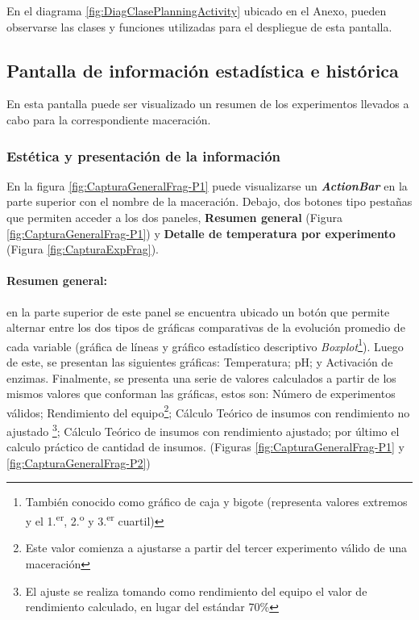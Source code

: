             \par En el diagrama \ref{fig:DiagClasePlanningActivity} ubicado en el Anexo, pueden observarse las clases y funciones utilizadas para el despliegue de esta pantalla.
            
            
        \subsection{Pantalla de información estadística e histórica}
        \label{DescripPantallaEstadística}
            \par En esta pantalla puede ser visualizado un resumen de los experimentos llevados a cabo para la correspondiente maceración.
        
            \subsubsection{Estética y presentación de la información}
            \par En la figura \ref{fig:CapturaGeneralFrag-P1} puede visualizarse un \textbf{\textit{\gls{ActionBar}}} en la parte superior con el nombre de la maceración. Debajo, dos botones tipo pestañas que permiten acceder a los dos paneles, \textbf{Resumen general} (Figura \ref{fig:CapturaGeneralFrag-P1}) y \textbf{Detalle de temperatura por experimento} (Figura \ref{fig:CapturaExpFrag}). 
            
            \paragraph{Resumen general:} en la parte superior de este panel se encuentra ubicado un botón que permite alternar entre los dos tipos de gráficas comparativas de la evolución promedio de cada variable (gráfica de líneas y gráfico estadístico descriptivo \textit{Boxplot}\footnote{También conocido como gráfico de caja y bigote (representa valores extremos y el 1.\textsuperscript{er}, 2.\textsuperscript{o} y 3.\textsuperscript{er} cuartil)}). Luego de este, se presentan las siguientes gráficas: Temperatura; pH; y Activación de enzimas. Finalmente, se presenta una serie de valores calculados a partir de los mismos valores que conforman las gráficas, estos son: Número de experimentos válidos; Rendimiento del equipo\footnote{Este valor comienza a ajustarse a partir del tercer experimento válido de una maceración}; Cálculo Teórico de insumos con rendimiento no ajustado \footnote{El ajuste se realiza tomando como rendimiento del equipo el valor de rendimiento calculado, en lugar del estándar 70\%}; Cálculo Teórico de insumos con rendimiento ajustado; por último el calculo práctico de cantidad de insumos. (Figuras \ref{fig:CapturaGeneralFrag-P1} y \ref{fig:CapturaGeneralFrag-P2}) 
            
